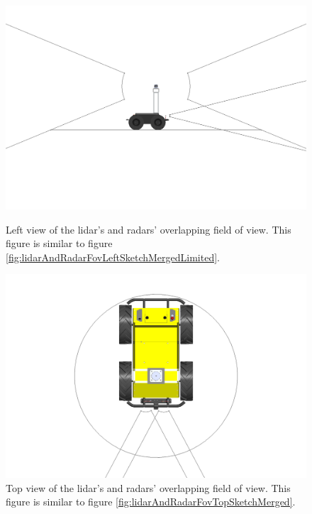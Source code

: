 \begin{figure}[H]
    \centering
    \begin{minipage}[b]{0.49\textwidth}
        \includegraphics[width=\textwidth]{Figures/CAD/FOV/lidarAndRadarFovLeftSketch.PNG}
        \caption{Left view of the lidar's and radars' overlapping field of view. This figure is similar to figure \ref{fig:lidarAndRadarFovLeftSketchMergedLimited}.}
        \label{fig:lidarAndRadarFovLeftSketch}
    \end{minipage}
    \begin{minipage}[b]{0.49\textwidth}
        \includegraphics[width=\textwidth]{Figures/CAD/FOV/lidarAndRadarFovTopSketch.PNG}
        \caption{Top view of the lidar's and radars' overlapping field of view. This figure is similar to figure \ref{fig:lidarAndRadarFovTopSketchMerged}.}
        \label{fig:lidarAndRadarFovTopSketch}
    \end{minipage}
\end{figure}

